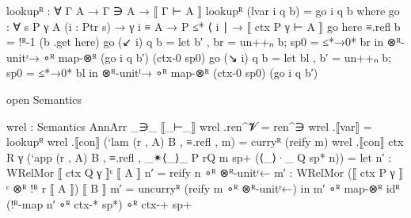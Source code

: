 \begin{code}
      lookupᴿ : ∀ {Γ A} → Γ ∋ A → ⟦ Γ ⊢ A ⟧
      lookupᴿ (lvar i q b) = go i q b
        where
        go : ∀ {s P γ A} (i : Ptr s) → γ i ≡ A → P ≤* ⟨ i ∣ → ⟦ ctx P γ ⊢ A ⟧
        go here ≡.refl b = !ᴿ-1 (b .get here)
        go (↙ i) q b =
          let b′ , br = un++ₙ b; sp0 = ≤*→0* br in
          ⊗ᴿ-unitʳ→ ∘ᴿ map-⊗ᴿ (go i q b′) (ctx-0 sp0)
        go (↘ i) q b =
          let bl , b′ = un++ₙ b; sp0 = ≤*→0* bl in
          ⊗ᴿ-unitˡ→ ∘ᴿ map-⊗ᴿ (ctx-0 sp0) (go i q b′)

      open Semantics

      wrel : Semantics AnnArr _∋_ ⟦_⊢_⟧
      wrel .ren^𝓥 = ren^∋
      wrel .⟦var⟧ = lookupᴿ
      wrel .⟦con⟧ (`lam (r , A) B , ≡.refl , m) = curryᴿ (reify m)
      wrel .⟦con⟧ {ctx R γ}
        (`app (r , A) B , ≡.refl , _✴⟨_⟩_ {P} {rQ} m sp+ (⟨_⟩·_ {Q} sp* n)) =
        let n′ : WRelMor ⟦ ctx Q γ ⟧ᶜ ⟦ A ⟧
            n′ = reify n ∘ᴿ ⊗ᴿ-unitʳ←
            m′ : WRelMor (⟦ ctx P γ ⟧ᶜ ⊗ᴿ !ᴿ r ⟦ A ⟧) ⟦ B ⟧
            m′ = uncurryᴿ (reify m ∘ᴿ ⊗ᴿ-unitʳ←)
        in
        m′ ∘ᴿ map-⊗ᴿ idᴿ (!ᴿ-map n′ ∘ᴿ ctx-* sp*) ∘ᴿ ctx-+ sp+
\end{code}

